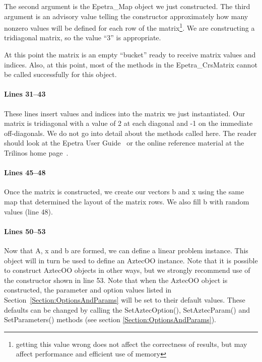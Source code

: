 \documentclass[12pt,relax]{AztecOOUserGuide}
\newcommand{\map}{Epetra\_Map}
\newcommand{\crsmatrix}{Epetra\_CrsMatrix}
\begin{document}
The second argument is the \map{} object we just constructed.  The
third argument is an advisory value telling the constructor
approximately how many nonzero values will be defined for each row of
the matrix\footnote{getting this value wrong does not
affect the correctness of results, but may affect performance and
efficient use of memory}.  We are constructing a tridiagonal matrix,
so the value ``3'' is appropriate.

At this point the matrix is an empty ``bucket'' ready to receive
matrix values and indices.  Also, at this point, most of the methods
in the \crsmatrix{} cannot be called successfully for this object.
\paragraph{Lines 31--43}
These lines insert values and indices into the matrix we just
instantiated.  Our matrix is tridiagonal with a value of 2 at each
diagonal and -1 on the immediate off-diagonals.  We do not go into
detail about the methods called here.  The reader should look at the
Epetra User Guide~\cite{Epetra-User-Guide} or the online reference
material at the Trilinos home page~\cite{Trilinos-home-page}.
\paragraph{Lines 45--48}
Once the matrix is constructed, we create our vectors b and x using
the same map that determined the layout of the matrix rows.  We also
fill b with random values (line 48).
\paragraph{Lines 50--53}
Now that A, x and b are formed, we can define a linear problem
instance.  This object will in turn be used to define an AztecOO
instance.  Note that it is possible to construct AztecOO objects in
other ways, but we strongly recommend use of the constructor shown in
line 53.  Note that when the AztecOO object is constructed, the
parameter and option values listed in
Section~\ref{Section:OptionsAndParams} will be set to their default
values.  These defaults can be changed by calling the SetAztecOption(),
SetAztecParam() and SetParameters() methods (see section \ref{Section:OptionsAndParams}).
\end{document}
